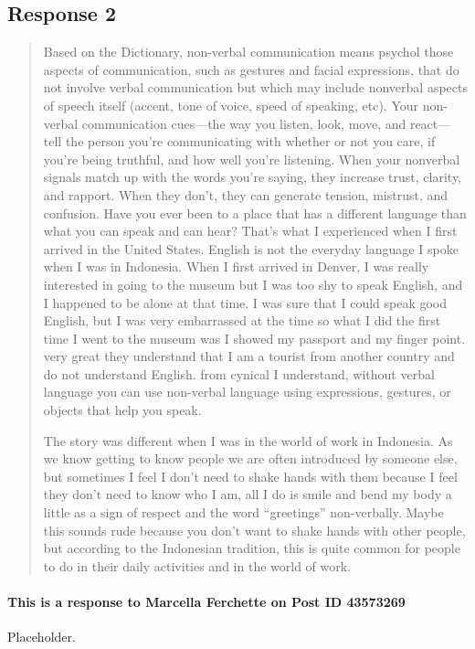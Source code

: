 
\subsection{Response 2}
  \begin{quotation}
    Based on the Dictionary, non-verbal communication means psychol those
      aspects of communication, such as gestures and facial expressions, that
      do not involve verbal communication but which may include nonverbal
      aspects of speech itself (accent, tone of voice, speed of speaking, etc).
      Your non-verbal communication cues—the way you listen, look, move, and
      react—tell the person you’re communicating with whether or not you care,
      if you’re being truthful, and how well you’re listening. When your
      nonverbal signals match up with the words you’re saying, they increase
      trust, clarity, and rapport. When they don’t, they can generate tension,
      mistrust, and confusion. Have you ever been to a place that has a
      different language than what you can speak and can hear? That's what I
      experienced when I first arrived in the United States. English is not the
      everyday language I spoke when I was in Indonesia. When I first arrived in
      Denver, I was really interested in going to the museum but I was too shy
      to speak English, and I happened to be alone at that time. I was sure
      that I could speak good English, but I was very embarrassed at the time
      so what I did the first time I went to the museum was I showed my passport
      and my finger point. very great they understand that I am a tourist from
      another country and do not understand English. from cynical I understand,
      without verbal language you can use non-verbal language using expressions,
      gestures, or objects that help you speak.

    The story was different when I was in the world of work in Indonesia. As we
      know getting to know people we are often introduced by someone else, but
      sometimes I feel I don't need to shake hands with them because I feel they
      don't need to know who I am, all I do is smile and bend my body a little
      as a sign of respect and the word   ``greetings'' non-verbally. Maybe this
      sounds rude because you don't want to shake hands with other people, but
      according to the Indonesian tradition, this is quite common for people to
      do in their daily activities and in the world of work.
  \end{quotation}

  \paragraph{This is a response to Marcella Ferchette on Post ID 43573269}
    Placeholder.
